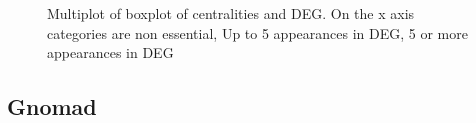 \begin{figure}[p]
    \vspace*{-2cm}
    \caption{Multiplot of boxplot of centralities and DEG. On the x axis categories are non essential, Up to 5 appearances in DEG, 5 or more appearances in DEG }
\end{figure}
\subsection{Gnomad}

